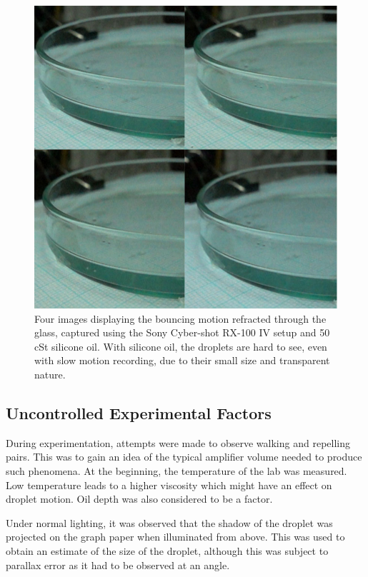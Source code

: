 \begin{figure}[ht]
\includegraphics[width=\textwidth]{prototype/exp_rep_imgs/bouncing_refr_glass.jpg}
\centering
\caption{Four images displaying the bouncing motion refracted through the glass, captured using the Sony Cyber-shot RX-100 IV setup and 50 cSt silicone oil. With silicone oil, the droplets are hard to see, even with slow motion recording, due to their small size and transparent nature.}
\centering
\label{fig:bouncing_refr_glass}
\end{figure}

\subsection{Uncontrolled Experimental Factors}
During experimentation, attempts were made to observe walking and repelling pairs. This was to gain an idea of the typical amplifier volume needed to produce such phenomena. At the beginning, the temperature of the lab was measured. Low temperature leads to a higher viscosity which might have an effect on droplet motion. Oil depth was also considered to be a factor.

Under normal lighting, it was observed that the shadow of the droplet was projected on the graph paper when illuminated from above. This was used to obtain an estimate of the size of the droplet, although this was subject to parallax error as it had to be observed at an angle.

